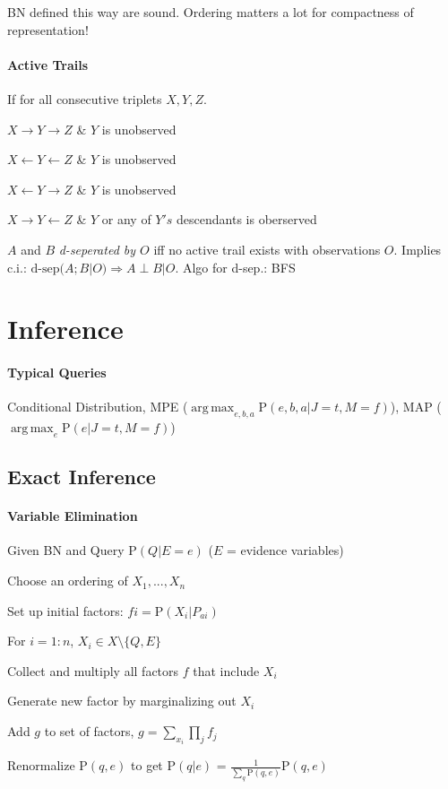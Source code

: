\documentclass[a4paper, 10pt]{scrartcl}
\DeclareMathOperator*{\argmax}{arg\,max}
\newcommand{\uP}{\mathrm P}
\begin{document}
\begin{multicols*}{3}
		BN defined this way are sound. Ordering matters a lot for compactness of representation!
		
		\paragraph{Active Trails} If for all consecutive triplets $X, Y, Z$.
		\begin{compactitem}
			\item  $X \rightarrow  Y \rightarrow Z$ \& $Y$ is unobserved
			\item  $X \leftarrow  Y \leftarrow Z$ \& $Y$ is unobserved
			\item  $X \leftarrow  Y \rightarrow Z$ \& $Y$ is unobserved
			\item  $X \rightarrow  Y \leftarrow Z$ \& $Y$ or any of $Y's$ descendants is oberserved
		\end{compactitem}
	
		$A$ and $B$ \emph{d-seperated by $O$} iff no active trail exists with observations $O$.
		Implies c.i.: $\text{d-sep}(A;B | O) \Rightarrow A \perp B | O$.
		Algo for d-sep.: BFS
		
		\section{Inference}
		\paragraph{Typical Queries} Conditional Distribution, MPE ($\argmax_{e,b,a} \uP(e,b,a | J=t, M = f)$), MAP ($\argmax_{e} \uP(e | J=t, M = f)$)
		
		\subsection{Exact Inference}
		
		\paragraph{Variable Elimination}
		\begin{compactitem}
		\item Given BN and Query $\uP(Q | E=e)$ ($E$ = evidence variables)
		\item Choose an ordering of $X_1, ..., X_n$
		\item Set up initial factors: $fi = \uP(X_i | P_{ai})$
		\item For $i =1:n$, $X_i  \in X\setminus \{Q,E\}$
		\begin{compactenum}
			\item Collect and multiply all factors $f$ that include $X_i$  
			\item Generate new factor by marginalizing out $X_i$
			\item Add $g$ to set of factors, $g = \sum_{x_i}\prod_{j}f_j$
		\end{compactenum}
		\item  Renormalize $\uP(q,e)$ to get $\uP(q | e)$ = $\frac{1}{\sum_{q}\uP(q,e)}\uP(q,e)$
		

\end{compactitem}
\end{multicols*}
\end{document}

